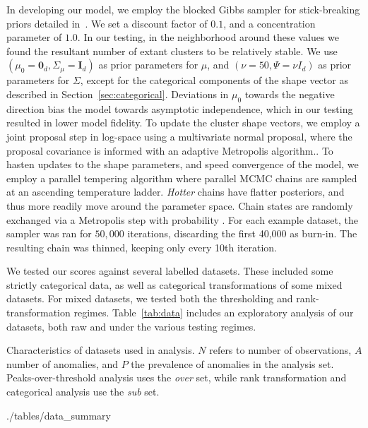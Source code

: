 In developing our model, we employ the blocked Gibbs sampler for stick-breaking
    priors detailed in~\cite{ishwaran2001}.  We set a discount factor of $0.1$, 
    and a concentration parameter of $1.0$.  In our testing, in the neighborhood
    around these values we found the resultant number of extant clusters to be 
    relatively stable.  We use $(\mu_0 = \bm{0}_d,\Sigma_{\mu} = \bm{I}_d)$ as 
    prior parameters for $\mu$, and $(\nu = 50,\Psi = \nu I_d)$ as prior 
    parameters for $\Sigma$, except for the categorical components of the shape 
    vector as described in Section~\ref{sec:categorical}.  Deviations in $\mu_0$ 
    towards the negative direction bias the model towards asymptotic 
    independence, which in our testing resulted in lower model fidelity.
    To update the cluster shape vectors, we employ a joint proposal step in 
    log-space using a multivariate normal proposal, where the proposal 
    covariance is informed with an adaptive Metropolis 
    algorithm..  To hasten updates to the shape
    parameters, and speed convergence of the model, we employ a parallel
    tempering algorithm where parallel MCMC chains are sampled at an ascending
    temperature ladder.  \emph{Hotter} chains have flatter posteriors, and thus 
    more readily move around the parameter space.  Chain states are randomly 
    exchanged via a Metropolis step
    with probability .
    For each example dataset, the sampler was ran for $50,000$ iterations,
    discarding the first 40,000 as burn-in.  The resulting chain was thinned,
    keeping only every 10th iteration.

We tested our scores against several labelled datasets.  These included some 
    strictly categorical data, as well as categorical transformations of some 
    mixed datasets.  For mixed datasets, we tested both the thresholding and 
    rank-transformation regimes. Table~\ref{tab:data} includes an exploratory 
    analysis of our datasets, both raw and under the various testing regimes.

\begin{table}[t]
    \centering
    \caption{Characteristics of datasets used in analysis.  $N$ refers to 
    number of observations, $A$ number of anomalies, and $P$ the prevalence of 
    anomalies in the analysis set.  Peaks-over-threshold analysis uses the 
    \emph{over} set, while rank transformation and categorical analysis use 
    the \emph{sub} set.\label{tab:data}}
    \bigskip
     {./tables/data_summary}
\end{table}

